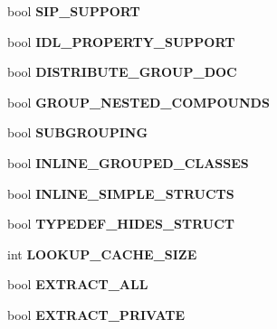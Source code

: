 \begin{DoxyCompactItemize}
bool {\bfseries S\+I\+P\+\_\+\+S\+U\+P\+P\+O\+RT}
\item 
\mbox{\label{class_config_values_a59c9fa189fbc0010808f7f369073bd51}} 
bool {\bfseries I\+D\+L\+\_\+\+P\+R\+O\+P\+E\+R\+T\+Y\+\_\+\+S\+U\+P\+P\+O\+RT}
\item 
\mbox{\label{class_config_values_a021a5884e6cf85c51e3fcbcc258c548c}} 
bool {\bfseries D\+I\+S\+T\+R\+I\+B\+U\+T\+E\+\_\+\+G\+R\+O\+U\+P\+\_\+\+D\+OC}
\item 
\mbox{\label{class_config_values_ab02128fc68468b22a104366e04dc39e9}} 
bool {\bfseries G\+R\+O\+U\+P\+\_\+\+N\+E\+S\+T\+E\+D\+\_\+\+C\+O\+M\+P\+O\+U\+N\+DS}
\item 
\mbox{\label{class_config_values_aa5f1c7db5ceefa0cac3306ad0593bbce}} 
bool {\bfseries S\+U\+B\+G\+R\+O\+U\+P\+I\+NG}
\item 
\mbox{\label{class_config_values_a748a48a65678a78cf9c03e28e16a5053}} 
bool {\bfseries I\+N\+L\+I\+N\+E\+\_\+\+G\+R\+O\+U\+P\+E\+D\+\_\+\+C\+L\+A\+S\+S\+ES}
\item 
\mbox{\label{class_config_values_ae4b0666305b51cbc0b99913d65169692}} 
bool {\bfseries I\+N\+L\+I\+N\+E\+\_\+\+S\+I\+M\+P\+L\+E\+\_\+\+S\+T\+R\+U\+C\+TS}
\item 
\mbox{\label{class_config_values_a4c36c1cd82d3f01b95f16719e14b61e5}} 
bool {\bfseries T\+Y\+P\+E\+D\+E\+F\+\_\+\+H\+I\+D\+E\+S\+\_\+\+S\+T\+R\+U\+CT}
\item 
\mbox{\label{class_config_values_ab8990c4c0068b8b1bbcc5c8a0208e552}} 
int {\bfseries L\+O\+O\+K\+U\+P\+\_\+\+C\+A\+C\+H\+E\+\_\+\+S\+I\+ZE}
\item 
\mbox{\label{class_config_values_a5fbfa7237565146262bcfa301eb969ff}} 
bool {\bfseries E\+X\+T\+R\+A\+C\+T\+\_\+\+A\+LL}
\item 
\mbox{\label{class_config_values_ac1bcd12a9a56a9b47535ec67f0a910de}} 
bool {\bfseries E\+X\+T\+R\+A\+C\+T\+\_\+\+P\+R\+I\+V\+A\+TE}

\end{DoxyCompactItemize}
